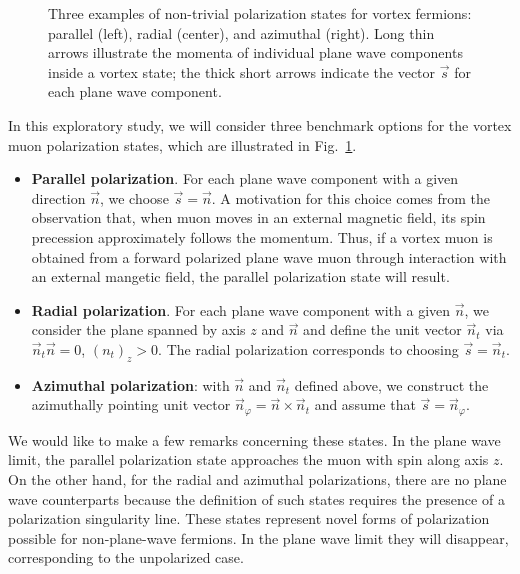 \documentclass[aps,prd,longbibliography,nofootinbib,amsthm,amsmath,amssymb,amsfonts,notitlepage]{revtex4-1}
\begin{document}
\begin{figure}[!h]
	\caption{Three examples of non-trivial polarization states for vortex fermions: parallel (left), radial (center), and azimuthal (right).
	Long thin arrows illustrate the momenta of individual plane wave components inside a vortex state; the thick short arrows
	indicate the vector $\vec s$ for each plane wave component.}
	\label{fig-polarization-states}
\end{figure}

In this exploratory study, we will consider three benchmark options for the vortex muon polarization states,
which are illustrated in Fig.~\ref{fig-polarization-states}.
\begin{itemize}
	\item
	{\bf Parallel polarization}. For each plane wave component with a given direction $\vec n$, we choose $\vec s = \vec n$.
	A motivation for this choice comes from the observation that,
	when muon moves in an external magnetic field, its spin precession approximately follows the momentum.
	Thus, if a vortex muon is obtained from a forward polarized plane wave muon through interaction with an external mangetic field,
	the parallel polarization state will result.
	\item
	{\bf Radial polarization}. For each plane wave component with a given $\vec n$, we consider the plane spanned by axis $z$ and $\vec n$
	and define the unit vector $\vec n_t$ via $\vec n_t \vec n = 0$, $(n_t)_z > 0$. The radial polarization corresponds to choosing $\vec s = \vec n_t$.
	\item
	{\bf Azimuthal polarization}: with $\vec n$ and $\vec n_t$ defined above, we construct the azimuthally pointing unit vector
	$\vec n_\varphi = \vec n \times \vec n_t$ and assume that $\vec s = \vec n_\varphi$.
\end{itemize}
We would like to make a few remarks concerning these states.
In the plane wave limit, the parallel polarization state approaches the muon with spin along axis $z$.
On the other hand, for the radial and azimuthal polarizations, there are no plane wave counterparts because
the definition of such states requires the presence of a polarization singularity line.
These states represent novel forms of polarization possible for non-plane-wave fermions.
In the plane wave limit they will disappear, corresponding to the unpolarized case.
\end{document}
